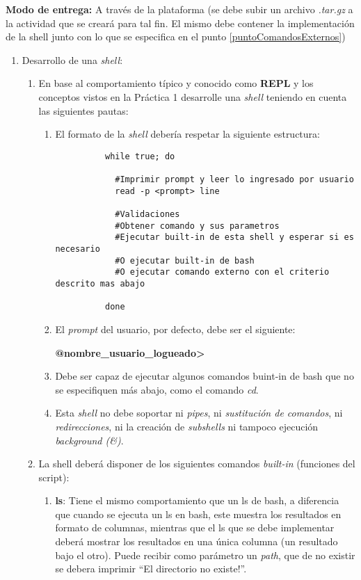 \textbf{Modo de entrega:} A través de la plataforma (se debe subir un archivo \textit{.tar.gz} a la actividad que se creará para tal fin. El mismo debe contener la implementación de la shell junto con lo que se especifica en el punto \ref{puntoComandosExternos})

\renewcommand{\labelenumiii}{\roman{enumiii})}

\begin{enumerate}
 \item Desarrollo de una \textit{shell}: \label{implementar_shell}
      \begin{enumerate}
	    \item En base al comportamiento típico y conocido como \textbf{REPL} y los conceptos vistos en la Práctica 1 desarrolle una \textit{shell} teniendo en cuenta las siguientes pautas:
	    \begin{enumerate}
	      \item El formato de la \textit{shell} debería respetar la siguiente estructura: 
	      \begin{lstlisting}
		  while true; do
		  
		    #Imprimir prompt y leer lo ingresado por usuario
			read -p <prompt> line		    

			#Validaciones
			#Obtener comando y sus parametros
		    #Ejecutar built-in de esta shell y esperar si es necesario
		    #O ejecutar built-in de bash
		    #O ejecutar comando externo con el criterio descrito mas abajo
		    
		  done
	      \end{lstlisting}
	      
	      \item El \textit{prompt} del usuario, por defecto, debe ser el siguiente: 

	      				\textbf{@nombre\_usuario\_logueado>}
	      
	      \item Debe ser capaz de ejecutar algunos comandos buint-in de bash que no se especifiquen más abajo, como el comando \textit{cd}.

	      \item Esta \textit{shell} no debe soportar ni \textit{pipes}, ni \textit{sustitución de comandos}, ni \textit{redirecciones}, ni la creación de \textit{subshells} ni tampoco ejecución \textit{background (\&)}.	      
	    \end{enumerate}
	    
	    \item La shell deberá disponer de los siguientes comandos \textit{built-in} (funciones del script):
	    \begin{enumerate}
	     \item \textbf{ls}: Tiene el mismo comportamiento que un ls de bash, a diferencia que cuando se ejecuta un ls en bash, este muestra los resultados en formato de columnas, mientras que el ls que se debe implementar deberá mostrar los resultados en una única columna (un resultado bajo el otro). Puede recibir como parámetro un \emph{path}, que de no existir se debera imprimir ``El directorio no existe!''. 


\end{enumerate}
\end{enumerate}
\end{enumerate}
